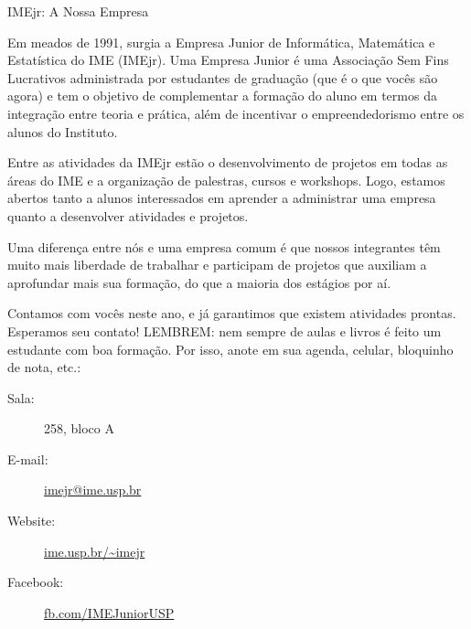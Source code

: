 \begin{subsecao}{IMEjr: A Nossa Empresa}


Em meados de 1991, surgia a Empresa Junior de Informática, Matemática e
Estatística do IME (IMEjr). Uma Empresa Junior é uma Associação Sem Fins
Lucrativos administrada por estudantes de graduação (que é o que vocês são
agora) e tem o objetivo de complementar a formação do aluno em termos da
integração entre teoria e prática, além de incentivar o empreendedorismo entre
os alunos do Instituto.

Entre as atividades da IMEjr estão o desenvolvimento de projetos em todas as
áreas do IME e a organização de palestras, cursos e workshops. Logo, estamos
abertos tanto a alunos interessados em aprender a administrar uma empresa
quanto a desenvolver atividades e projetos.

Uma diferença entre nós e uma empresa comum é que nossos integrantes têm muito
mais liberdade de trabalhar e participam de projetos que auxiliam a aprofundar
mais sua formação, do que a maioria dos estágios por aí.

Contamos com vocês neste ano, e já garantimos que existem atividades prontas.
Esperamos seu contato! LEMBREM: nem sempre de aulas e livros é feito um
estudante com boa formação. Por isso, anote em sua agenda, celular, bloquinho
de nota, etc.:

\begin{description}
\item [Sala:] 258, bloco A
\item[E-mail:] \url{imejr@ime.usp.br}
\item[Website:] \url{ime.usp.br/~imejr}
\item[Facebook:] \url{fb.com/IMEJuniorUSP}
\end{description}

\end{subsecao}
